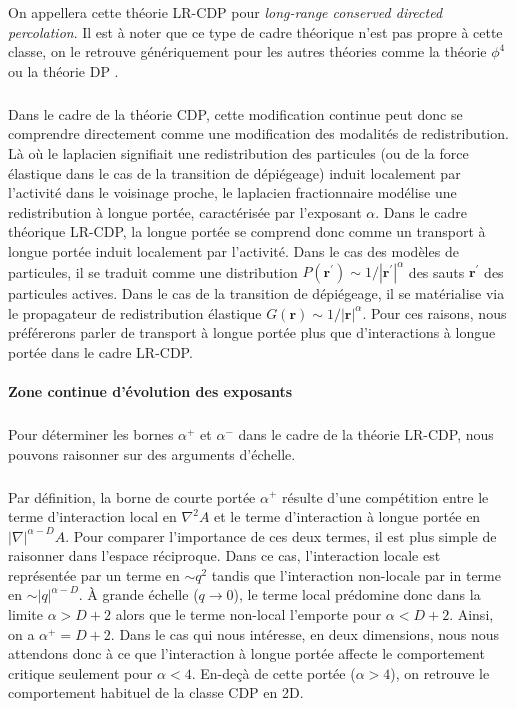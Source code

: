 \noindent On appellera cette théorie LR-CDP pour \textit{long-range conserved directed percolation}. Il est à noter que ce type de cadre théorique n'est pas propre à cette classe, on le retrouve génériquement pour les autres théories comme la théorie $\phi^4$ ou la théorie DP \cite{fisher_critical_1972, hinrichsen_non_equilibrium_2007}.

\subparagraph{}Dans le cadre de la théorie CDP, cette modification continue peut donc se comprendre directement comme une modification des modalités de redistribution. Là où le laplacien signifiait une redistribution des particules (ou de la force élastique dans le cas de la transition de dépiégeage) induit localement par l'activité dans le voisinage proche, le laplacien fractionnaire modélise une redistribution à longue portée, caractérisée par l'exposant $\alpha$. Dans le cadre théorique LR-CDP, la longue portée se comprend donc comme un transport à longue portée induit localement par l'activité. Dans le cas des modèles de particules, il se traduit comme une distribution $P(\mathbf{r}^\prime)\sim 1/|\mathbf{r}^{\prime}|^{\alpha}$ des sauts $\mathbf{r}^{\prime}$ des particules actives. Dans le cas de la transition de dépiégeage, il se matérialise via le propagateur de redistribution élastique $G(\mathbf{r})\sim 1/|\mathbf{r}|^\alpha$. Pour ces raisons, nous préférerons parler de transport à longue portée plus que d'interactions à longue portée dans le cadre LR-CDP.

\paragraph{Zone continue d'évolution des exposants}

\subparagraph{}Pour déterminer les bornes $\alpha^+$ et $\alpha^-$ dans le cadre de la théorie LR-CDP, nous pouvons raisonner sur des arguments d'échelle.

\subparagraph{}Par définition, la borne de courte portée $\alpha^+$ résulte d'une compétition entre le terme d'interaction local en $\nabla^2 A$ et le terme d'interaction à longue portée en $|\nabla|^{\alpha-D} A$. Pour comparer l'importance de ces deux termes, il est plus simple de raisonner dans l'espace réciproque. Dans ce cas, l'interaction locale est représentée par un terme en $\sim q^2$ tandis que l'interaction non-locale par in terme en $\sim |q|^{\alpha-D}$. \`A grande échelle ($q \rightarrow 0$), le terme local prédomine donc dans la limite $\alpha > D+2$ alors que le terme non-local l'emporte pour $\alpha < D+2$. Ainsi, on a $\alpha^+ = D+2$. Dans le cas qui nous intéresse, en deux dimensions, nous nous attendons donc à ce que l'interaction à longue portée affecte le comportement critique seulement pour $\alpha < 4$. En-deçà de cette portée ($\alpha > 4$), on retrouve le comportement habituel de la classe CDP en 2D.

